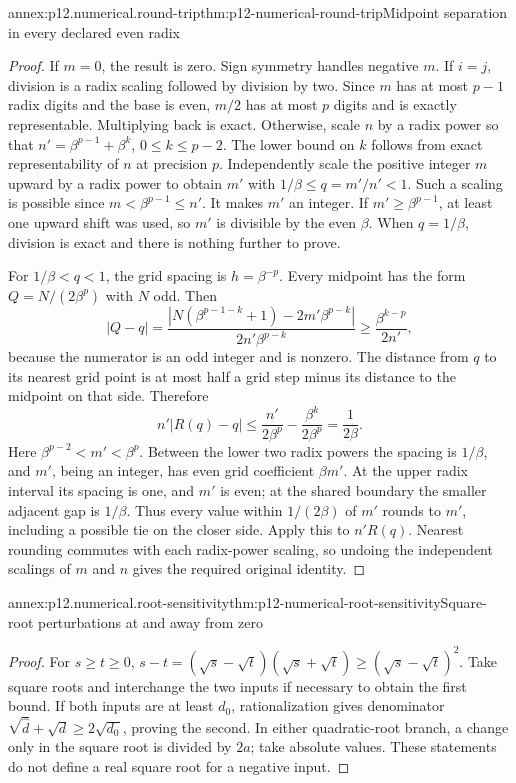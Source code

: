 \begin{annexitem}{annex:p12.numerical.round-trip}{thm:p12-numerical-round-trip}{Midpoint separation in every declared even radix}
\begin{proof}
If \(m=0\), the result is zero. Sign symmetry handles negative
\(m\). If \(i=j\), division is a radix scaling followed by division
by two. Since \(m\) has at most \(p-1\) radix digits and the base
is even, \(m/2\) has at most \(p\) digits and is exactly
representable. Multiplying back is exact. Otherwise, scale \(n\) by a radix power
so that
\(n'=\beta^{p-1}+\beta^k\), \(0\leq k\leq p-2\). The lower bound
on \(k\) follows from exact representability of \(n\) at precision
\(p\). Independently scale the positive integer \(m\) upward
by a radix power to obtain \(m'\) with
\(1/\beta\leq q=m'/n'<1\). Such a scaling is possible since
\(m<\beta^{p-1}\leq n'\). It makes \(m'\) an integer. If
\(m'\geq\beta^{p-1}\), at least one upward shift was used, so
\(m'\) is divisible by the even \(\beta\). When \(q=1/\beta\), division is exact and there is
nothing further to prove.

For \(1/\beta<q<1\), the grid spacing is \(h=\beta^{-p}\).
Every midpoint has the form \(Q=N/(2\beta^p)\) with \(N\) odd.
Then
\[
 |Q-q|=
 \frac{|N(\beta^{p-1-k}+1)-2m'\beta^{p-k}|}{2n'\beta^{p-k}}
 \geq\frac{\beta^{k-p}}{2n'},
\]
because the numerator is an odd integer and is nonzero. The distance
from \(q\) to its nearest grid point is at most half a grid step
minus its distance to the midpoint on that side. Therefore
\[
 n'|R(q)-q|
 \leq\frac{n'}{2\beta^p}-\frac{\beta^k}{2\beta^p}
 =\frac1{2\beta}.
\]
Here \(\beta^{p-2}<m'<\beta^p\). Between the lower two radix powers the
spacing is \(1/\beta\), and \(m'\), being an integer, has even
grid coefficient \(\beta m'\). At the upper radix interval its spacing is one,
and \(m'\) is even; at the shared boundary the smaller adjacent gap
is \(1/\beta\). Thus every value within \(1/(2\beta)\) of \(m'\)
rounds to \(m'\), including a possible tie on the closer side.
Apply this to \(n'R(q)\). Nearest rounding commutes with each
radix-power scaling, so undoing the independent scalings of
\(m\) and \(n\) gives the required original identity.
\end{proof}
\end{annexitem}

\begin{annexitem}{annex:p12.numerical.root-sensitivity}{thm:p12-numerical-root-sensitivity}{Square-root perturbations at and away from zero}
\begin{proof}
For \(s\geq t\geq0\),
\(s-t=(\sqrt s-\sqrt t)(\sqrt s+\sqrt t)
\geq(\sqrt s-\sqrt t)^2\).
Take square roots and interchange the two inputs if necessary to
obtain the first bound. If both inputs are at least \(d_0\),
rationalization gives denominator
\(\sqrt{\widehat d}+\sqrt d\geq2\sqrt{d_0}\), proving the
second. In either quadratic-root branch, a change only in the square
root is divided by \(2a\); take absolute values. These statements
do not define a real square root for a negative input.
\end{proof}
\end{annexitem}

